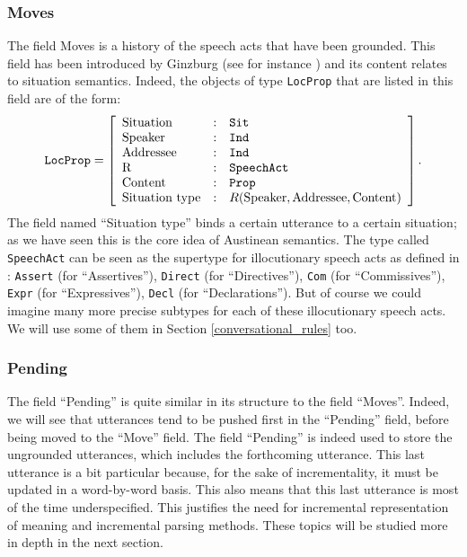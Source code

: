 \documentclass[11pt]{article}
\begin{document}
			\subsubsection{Moves}
				The field Moves is a history of the speech acts that have been grounded. This field  has been introduced by Ginzburg (see for instance \cite{ginzburg2012, ginzburg2020}) and its content relates to situation semantics. Indeed, the objects of type \texttt{LocProp} that are listed in this field are of the form:
				\begin{equation*}
					\texttt{LocProp} = \left[
					\begin{array}{l l l}
					\mbox{Situation} &:& \texttt{Sit} \\
					\mbox{Speaker} &:& \texttt{Ind} \\
					\mbox{Addressee} &:& \texttt{Ind} \\
					\mbox{R} &:& \texttt{SpeechAct} \\ 
					\mbox{Content} &:& \texttt{Prop} \\
					\mbox{Situation type} &:& R(\mbox{Speaker}, \mbox{Addressee}, \mbox{Content}) \\
					\end{array}
					\right].
				\end{equation*}
				The field named ``Situation type'' binds a certain utterance to a certain situation; as we have seen this is the core idea of Austinean semantics. The type called \texttt{SpeechAct} can be seen as the supertype for illocutionary speech acts as defined in \cite{austin1975} : \texttt{Assert} (for ``Assertives''), \texttt{Direct} (for ``Directives''), \texttt{Com} (for ``Commissives''), \texttt{Expr} (for ``Expressives''), \texttt{Decl} (for ``Declarations''). But of course we could imagine many more precise subtypes for each of these illocutionary speech acts. We will use some of them in Section \ref{conversational_rules} too.
			\subsubsection{Pending}
				The field ``Pending'' is quite similar in its structure to the field ``Moves''. Indeed, we will see that utterances tend to be pushed first in the ``Pending'' field, before being moved to the ``Move'' field. The field ``Pending'' is indeed used to store the ungrounded utterances, which includes the forthcoming utterance. This last utterance is a bit particular because, for the sake of incrementality, it must be updated in a word-by-word basis. This also means that this last utterance is most of the time underspecified. This justifies the need for incremental representation of meaning and incremental parsing methods. These topics will be studied more in depth in the next section.
				
\end{document}
